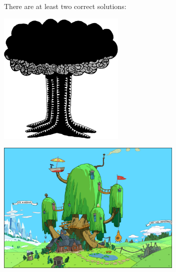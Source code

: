 \documentclass[11pt]{article}
\begin{document}
\begin{solution}
There are at least two correct solutions:
\begin{center}
\includegraphics[height=2.5in]{Fig/GranMaPa} 			%

\bigskip
\includegraphics[height=2.5in]{Fig/FinnJakeTreehouse}
\end{center}
\end{solution}
\end{document}
